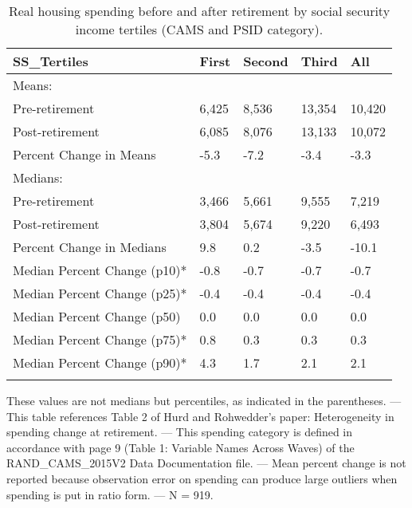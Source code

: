 \begin{table}[tbp] \centering
{}

\caption{Real housing spending before and after retirement by social security income tertiles (CAMS and PSID category).}
\begin{tabularx}{\textwidth}{lCCCC}

\toprule
{SS\_Tertiles}&{First}&{Second}&{Third}&{All} \tabularnewline
\midrule\addlinespace[1.5ex]
Means:&&&& \tabularnewline
\midrule Pre-retirement&6,425&8,536&13,354&10,420 \tabularnewline
Post-retirement&6,085&8,076&13,133&10,072 \tabularnewline
Percent Change in Means&-5.3&-7.2&-3.4&-3.3 \tabularnewline
\midrule Medians:&&&& \tabularnewline
\midrule Pre-retirement&3,466&5,661&9,555&7,219 \tabularnewline
Post-retirement&3,804&5,674&9,220&6,493 \tabularnewline
Percent Change in Medians&9.8&0.2&-3.5&-10.1 \tabularnewline
Median Percent Change (p10)*&-0.8&-0.7&-0.7&-0.7 \tabularnewline
Median Percent Change (p25)*&-0.4&-0.4&-0.4&-0.4 \tabularnewline
Median Percent Change (p50)&0.0&0.0&0.0&0.0 \tabularnewline
Median Percent Change (p75)*&0.8&0.3&0.3&0.3 \tabularnewline
Median Percent Change (p90)*&4.3&1.7&2.1&2.1 \tabularnewline
\bottomrule \addlinespace[1.5ex]

\end{tabularx}
\begin{flushleft}
\footnotesize *These values are not medians but percentiles, as indicated in the parentheses. \linebreak --- \linebreak This table references Table 2 of Hurd and Rohwedder's paper: Heterogeneity in spending change at retirement. \linebreak --- \linebreak This spending category is defined in accordance with page 9 (Table 1: Variable Names Across Waves) of the RAND\_CAMS\_2015V2 Data Documentation file. \linebreak --- \linebreak Mean percent change is not reported because observation error on spending can produce large outliers when spending is put in ratio form. \linebreak --- \linebreak N = 919.
\end{flushleft}
\end{table}
